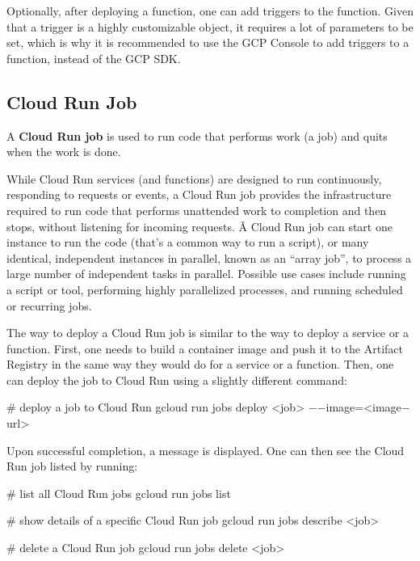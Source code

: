Optionally, after deploying a function, one can add triggers to the function. Given that a trigger is a highly
customizable object, it requires a lot of parameters to be set, which is why it is recommended to use the GCP Console
to add triggers to a function, instead of the GCP SDK\@.

\subsection{Cloud Run Job}

A \textbf{Cloud Run job} is used to run code that performs work (a job) and quits when the work is done.
\ed

While Cloud Run services (and functions) are designed to run continuously, responding to requests or events, a Cloud
Run job provides the infrastructure required to run code that performs unattended work to completion and then stops,
without listening for incoming requests. \v

A Cloud Run job can start one instance to run the code (that's a common way to run a script), or many identical,
independent instances in parallel, known as an ``array job'', to process a large number of independent tasks in
parallel. Possible use cases include running a script or tool, performing highly parallelized processes, and running
scheduled or recurring jobs.


The way to deploy a Cloud Run job is similar to the way to deploy a service or a function. First, one needs to build a
container image and push it to the Artifact Registry in the same way they would do for a service or a function. Then,
one can deploy the job to Cloud Run using a slightly different command:
\begin{bash}
# deploy a job to Cloud Run
gcloud run jobs deploy <job> $-$$-$image=<image$-$url>
\end{bash}

Upon successful completion, a message is displayed. One can then see the Cloud Run job listed by running:
\begin{bash}
# list all Cloud Run jobs
gcloud run jobs list
\end{bash}

\begin{bash}
# show details of a specific Cloud Run job
gcloud run jobs describe <job>
\end{bash}

\begin{bash}
# delete a Cloud Run job
gcloud run jobs delete <job>
\end{bash}

